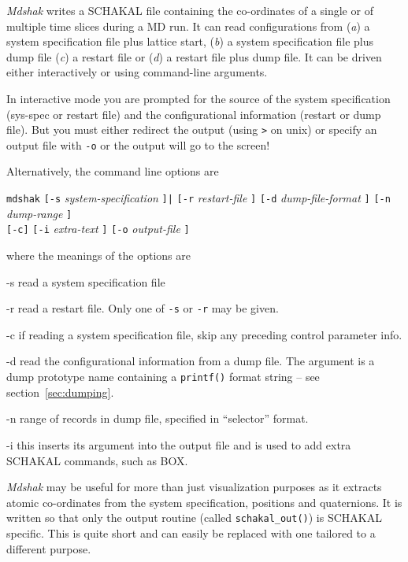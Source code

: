 {\em Mdshak\/} writes a SCHAKAL file containing the co-ordinates of a
single or of multiple time slices during a MD run.  It can read
configurations from ({\em a\/}) a system specification file plus
lattice start,  ({\em b\/}) a system specification file plus
dump file ({\em c\/}) a restart file or ({\em d\/}) a restart file
plus dump file.   It can be driven either interactively or using
command-line arguments.  

In interactive mode you are prompted for the source of the system
specification (sys-spec or restart file) and the configurational
information (restart or dump file).  But you must either redirect the
output (using \verb'>' on unix) or specify an output file with
\verb'-o' or the output will go to the screen!

Alternatively, the command line options are
\begin{center}
\verb'mdshak'
\verb'[-s' {\em system-specification\/} \verb']|'%
\verb'[-r' {\em restart-file\/} \verb']'
\verb'[-d' {\em dump-file-format\/} \verb']'
\verb'[-n' {\em dump-range\/} \verb']' \\
\verb'[-c]'
\verb'[-i' {\em extra-text\/} \verb']'
\verb'[-o' {\em output-file} \verb']'
\end{center}
where the meanings of the options are
\begin{list}{}{\let\makelabel\boldlabel\itemsep=0pt\parsep=3pt\leftmargin=1.5cm}
\item[-s] read a system specification file
\item[-r] read a restart file.  Only one of \verb'-s' or \verb'-r' may
be given.
\item[-c] if reading a system specification file, skip any preceding
control parameter info.
\item[-d] read the configurational information from a dump file.  The
argument is a dump prototype name containing a \verb'printf()' format
string -- see section~\ref{sec:dumping}.
\item[-n] range of records in dump file, specified in ``selector''
format.
\item[-i]   this inserts its argument into the output file and is used
to add extra SCHAKAL commands, such as BOX.
\end{list}

{\em Mdshak\/} may be useful for more than just visualization purposes
as it extracts atomic co-ordinates from the system specification,
positions and quaternions.  It is written so that only the output routine
(called \verb'schakal_out()') is SCHAKAL specific.  This is quite
short and can easily be replaced with one tailored to a different
purpose.





